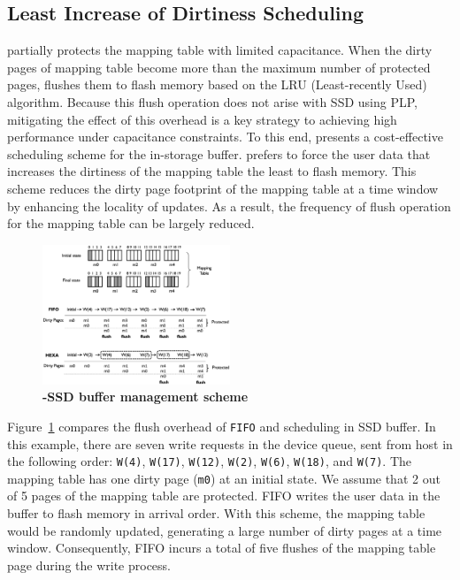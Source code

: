 \subsection{Least Increase of Dirtiness Scheduling}
\label{subsec:lind_sched}
\fi
\ours{} partially protects the mapping table with limited capacitance. 
When the dirty pages of mapping table become more than the maximum number of protected pages, 
\ours{} flushes them to flash memory based on the LRU (Least-recently Used) algorithm. 
Because this flush operation does not arise with SSD using PLP, mitigating the effect of this overhead 
is a key strategy to achieving high performance under capacitance constraints. 
To this end, \ours{} presents a cost-effective scheduling scheme for the in-storage buffer.
\ours{} prefers to force the user data that increases the dirtiness of the mapping 
table the least to flash memory. This scheme reduces the dirty page footprint 
of the mapping table at a time window by enhancing the locality of updates. 
As a result, the frequency of flush operation for the mapping table can be 
largely reduced. 

\begin{figure}
    \centering{}
    \includegraphics[width=0.5\textwidth]{figure/dawid_algo.eps}
    \caption{\textbf{\ours{}-SSD buffer management scheme}}
    \label{fig:dawid_buff_overview}
\end{figure}


Figure~\ref{fig:dawid_buff_overview} compares the flush overhead of \texttt{FIFO} and \ours{} scheduling in SSD buffer. 
In this example, there are seven write requests 
in the device queue, sent from host in the following order: \texttt{W(4)}, \texttt{W(17)}, \texttt{W(12)}, \texttt{W(2)}, \texttt{W(6)}, \texttt{W(18)}, and \texttt{W(7)}.  
The mapping table has one dirty page (\texttt{m0}) 
at an initial state. We assume that 2 out of 5 pages of the mapping table are protected. 
FIFO writes the user data in the buffer to flash memory in arrival order. 
With this scheme, the mapping table would be randomly updated, generating a large number of dirty pages at a 
time window. 
Consequently, FIFO incurs a total of five flushes of the mapping table page during the write process. 


